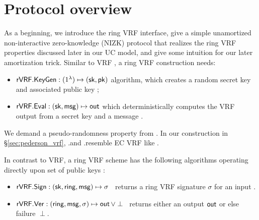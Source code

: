 \section{Protocol overview}
\label{sec:overview}

As a beginning, we introduce the ring VRF interface, give a simple
unamortized non-interactive zero-knowledge (NIZK) protocol that
realizes the ring VRF properties discussed later in our UC model,
and give some intuition for our later amortization trick.
Similar to VRF \cite{vrf_micali}, a ring VRF construction needs: 

\begin{itemize}
\item ${\mathsf{rVRF}}.{\mathsf{KeyGen}} : (1^{\lambda}) \mapsto (\mathsf{sk}, \mathsf{pk})$ algorithm,
 which creates a random secret key \sk and associated public key \pk;

\item ${\mathsf{rVRF}}.{\mathsf{Eval}} : (\mathsf{sk},\mathsf{msg}) \mapsto {\ensuremath{\mathsf{out}}}$ which deterministically computes the VRF output \Out from a secret key \sk and a message \msg.
\end{itemize}
%


We demand a pseudo-randomness property from \Eval. In our construction in \S\ref{sec:pederson_vrf},  \rVRF.\KeyGen and \rVRF.\Eval resemble EC VRF like \cite{nsec5,VXEd25519,draft-irtf-cfrg-vrf-10}.


In contrast to VRF, a ring VRF scheme has the following algorithms operating directly upon
 set of public keys \ring:
\begin{itemize}
\item ${\mathsf{rVRF}}.{\mathsf{Sign}} : (\mathsf{sk},\mathsf{ring},\mathsf{msg}) \mapsto \sigma$ \,
    returns a ring VRF signature $\sigma$ for an input \msg.
\item ${\mathsf{rVRF}}.{\mathsf{Ver}} : (\mathsf{ring},\mathsf{msg},\sigma) \mapsto {\ensuremath{\mathsf{out}}} \, \lor \perp$ \,
    returns either an output ${\mathsf{out}}$ or else failure $\perp$.
\end{itemize}

